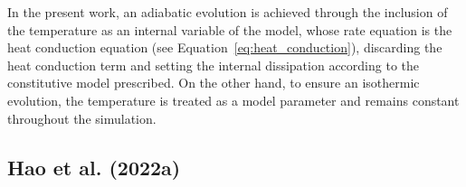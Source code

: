 In the present work, an adiabatic evolution is achieved through the inclusion of the temperature as an internal variable of the model, whose rate equation is the heat conduction equation (see Equation~\eqref{eq:heat_conduction}), discarding the heat conduction term and setting the internal dissipation according to the constitutive model prescribed.
On the other hand, to ensure an isothermic evolution, the temperature is treated as a model parameter and remains constant throughout the simulation.

\subsection{Hao et al. (2022a)}


